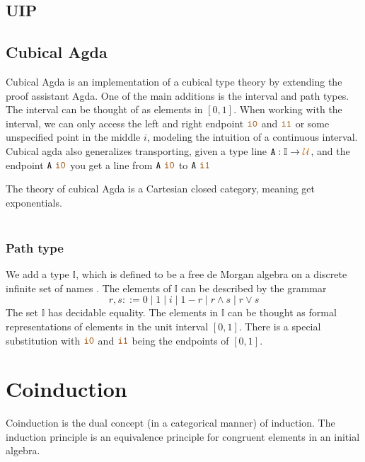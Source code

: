 \documentclass[twoside,11pt,openright]{report}
\theoremstyle{plain} %
\theoremstyle{definition}
\theoremstyle{remark}
\newcommand*{\universe}[1]{\textcolor{orange!80!black}{#1}}
\newcommand*{\constant}[1]{\textcolor{orange!60!black}{\ensuremath{\mathtt{#1}}}}
\newcommand*{\typeformer}[1]{\ensuremath{\mathtt{#1}}}
\begin{document}
\subsection{UIP}
\subsection{Cubical Agda}
Cubical Agda is an implementation of a cubical type theory by extending the proof assistant Agda. One of the main additions is the interval and path types. The interval can be thought of as elements in \([0,1]\). When working with the interval, we can only access the left and right endpoint \(\constant{i0}\) and \(\constant{i1}\) or some unspecified point in the middle \(i\), modeling the intuition of a continuous interval. Cubical agda also generalizes transporting, given a type line \(\typeformer{A} : \mathbb{I} \rightarrow \universe{\mathcal{U}}\), and the endpoint \(\typeformer{A}~\constant{i0}\) you get a line from \(\typeformer{A}~\constant{i0}\) to \(\typeformer{A}~\constant{i1}\) \cite{cubicalagda}

The theory of cubical Agda is a Cartesian closed category, meaning get exponentials.
\\ \\

\subsubsection{Path type}
We add a type \(\mathbb{I}\), which is defined to be a free de Morgan algebra on a discrete infinite set of names . The elements of \(\mathbb{I}\) can be described by the grammar
\begin{equation}
  r,s ::= 0 \mid 1 \mid i \mid 1 - r \mid r \land s \mid r \lor s
\end{equation}
The set \(\mathbb{I}\) has decidable equality. The elements in \(\mathbb{I}\) can be thought as formal representations of elements in the unit interval \([0,1]\). There is a special substitution with \(\constant{i0}\) and \(\constant{i1}\) being the endpoints of \([0,1]\).


\section{Coinduction}
Coinduction is the dual concept (in a categorical manner) of induction. The induction principle is an equivalence principle for congruent elements in an initial algebra.
\end{document}
